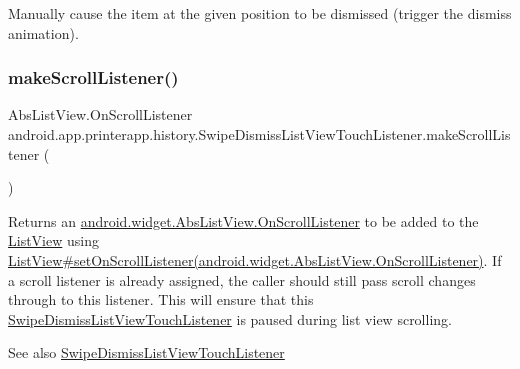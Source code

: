Manually cause the item at the given position to be dismissed (trigger the dismiss animation). \mbox{\label{classandroid_1_1app_1_1printerapp_1_1history_1_1_swipe_dismiss_list_view_touch_listener_a8cff088047f50f3b22379d5a1f40ff8a}} 
\subsubsection{\texorpdfstring{make\+Scroll\+Listener()}{makeScrollListener()}}
{\footnotesize\ttfamily Abs\+List\+View.\+On\+Scroll\+Listener android.\+app.\+printerapp.\+history.\+Swipe\+Dismiss\+List\+View\+Touch\+Listener.\+make\+Scroll\+Listener (\begin{DoxyParamCaption}{ }\end{DoxyParamCaption})}

Returns an \hyperlink{}{android.\+widget.\+Abs\+List\+View.\+On\+Scroll\+Listener} to be added to the \hyperlink{}{List\+View} using \hyperlink{}{List\+View\#set\+On\+Scroll\+Listener(android.\+widget.\+Abs\+List\+View.\+On\+Scroll\+Listener)}. If a scroll listener is already assigned, the caller should still pass scroll changes through to this listener. This will ensure that this \hyperlink{classandroid_1_1app_1_1printerapp_1_1history_1_1_swipe_dismiss_list_view_touch_listener}{Swipe\+Dismiss\+List\+View\+Touch\+Listener} is paused during list view scrolling.

\begin{DoxySeeAlso}{See also}
\hyperlink{classandroid_1_1app_1_1printerapp_1_1history_1_1_swipe_dismiss_list_view_touch_listener}{Swipe\+Dismiss\+List\+View\+Touch\+Listener} 
\end{DoxySeeAlso}
\mbox{\label{classandroid_1_1app_1_1printerapp_1_1history_1_1_swipe_dismiss_list_view_touch_listener_ade17676e25aa6e39a8d12882d5fd5935}} 
